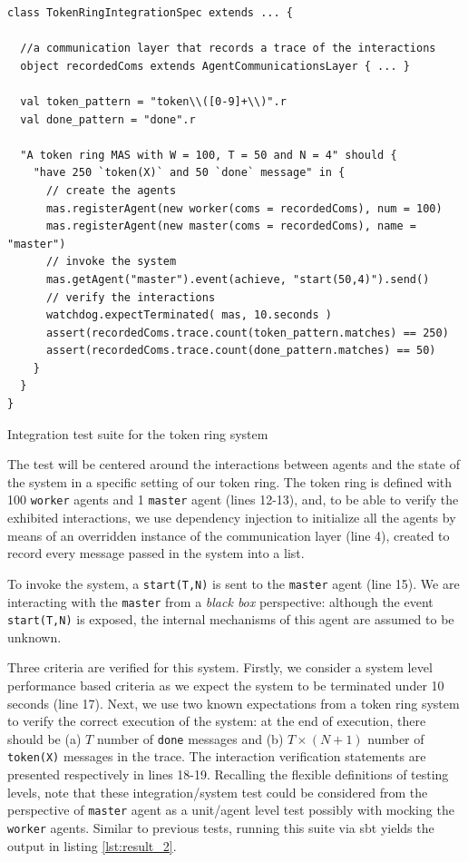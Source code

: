 \begin{listing}[!tbh]
\centering
\begin{verbatim}
class TokenRingIntegrationSpec extends ... {
  
  //a communication layer that records a trace of the interactions
  object recordedComs extends AgentCommunicationsLayer { ... }

  val token_pattern = "token\\([0-9]+\\)".r
  val done_pattern = "done".r

  "A token ring MAS with W = 100, T = 50 and N = 4" should {
    "have 250 `token(X)` and 50 `done` message" in {
      // create the agents
      mas.registerAgent(new worker(coms = recordedComs), num = 100)
      mas.registerAgent(new master(coms = recordedComs), name = "master")
      // invoke the system
      mas.getAgent("master").event(achieve, "start(50,4)").send()
      // verify the interactions
      watchdog.expectTerminated( mas, 10.seconds )
      assert(recordedComs.trace.count(token_pattern.matches) == 250)
      assert(recordedComs.trace.count(done_pattern.matches) == 50)
    }
  }
}
\end{verbatim}
\vspace{-5pt}
    \caption{Integration test suite for the token ring system}
    \label{lst:test_3}
    \vspace{-5pt}
\end{listing}


The test will be centered around the interactions between agents and the state of the system in a specific setting of our token ring. The token ring is defined with 100 \texttt{worker} agents and 1 \texttt{master} agent (lines 12-13), and, to be able to verify the exhibited interactions, we use dependency injection to initialize all the agents by means of an overridden instance of the communication layer (line 4), created to record every message passed in the system into a list. 

To invoke the system, a \texttt{start(T,N)} is sent to the \texttt{master} agent (line 15). We are interacting with the \texttt{master} from a \textit{black box} perspective: although the event \texttt{start(T,N)} is exposed, the internal mechanisms of this agent are assumed to be unknown.

Three criteria are verified for this system. Firstly, we consider a system level performance based criteria as we expect the system to be terminated under 10 seconds (line 17). Next, we use two known expectations from a token ring system to verify the correct execution of the system: at the end of execution, there should be (a) $T$ number of \texttt{done} messages and (b) $T \times (N + 1)$ number of \texttt{token(X)} messages in the trace. The interaction verification statements are presented respectively in lines 18-19. Recalling the flexible definitions of testing levels, note that these integration/system test could be considered from the perspective of \texttt{master} agent as a unit/agent level test possibly with mocking the \texttt{worker} agents. Similar to previous tests, running this suite via sbt yields the output in listing \ref{lst:result_2}.

